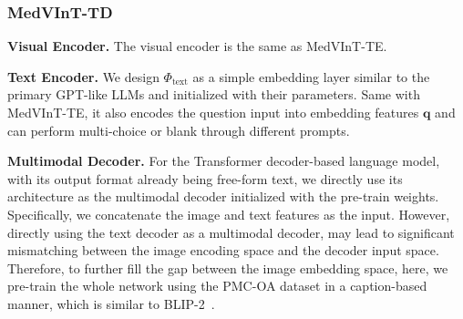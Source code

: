 \documentclass{article}
\begin{document}
\subsubsection{MedVInT-TD}
\label{sec:MedVInT-TD}

\textbf{Visual Encoder.} 
The visual encoder is the same as MedVInT-TE.


\textbf{Text Encoder.} 
We design $\Phi_\text{text}$ as a simple embedding layer similar to the primary GPT-like LLMs and initialized with their parameters. Same with MedVInT-TE, it also encodes the question input into embedding features $\boldsymbol{q}$ and can perform multi-choice or blank through different prompts.

\textbf{Multimodal Decoder.}
For the Transformer decoder-based language model, with its output format already being free-form text, we directly use its architecture as the multimodal decoder initialized with the pre-train weights. 
Specifically, we concatenate the image and text features as the input.
However, directly using the text decoder as a multimodal decoder, may lead to significant mismatching between the image encoding space and the decoder input space. Therefore, to further fill the gap between the image embedding space, here, we pre-train the whole network using the PMC-OA\cite{lin2023pmcclip} dataset in a caption-based manner, which is similar to BLIP-2~\cite{li2023blip}. 
\end{document}

